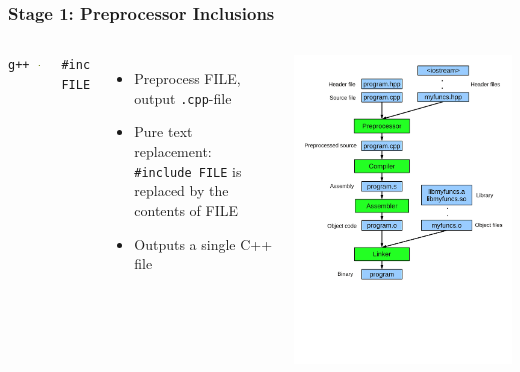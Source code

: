 \documentclass{slides}
\begin{document}
\begin{frame}[fragile]
  \frametitle{Stage 1: Preprocessor Inclusions}
  \begin{columns}[T,onlytextwidth]
\begin{lstlisting}[language=bash]
g++ -E <source>
\end{lstlisting}
\begin{lstlisting}
#include FILE
\end{lstlisting}
    \begin{itemize}
    \item Preprocess FILE, output \lstinline!.cpp!-file
    \item Pure text replacement: \lstinline!#include FILE! is replaced
      by the contents of FILE
    \item Outputs a single C++ file
    \end{itemize}

    \includegraphics[height=1.1\textheight]{compilation}
  \end{columns}
\end{frame}
\end{document}
